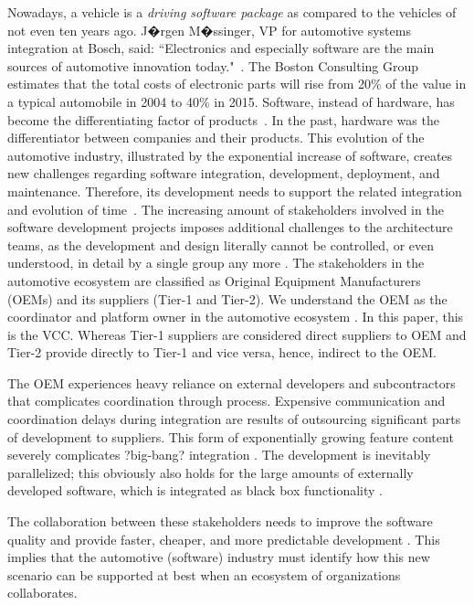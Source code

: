 Nowadays, a vehicle is a {\em driving software package} as compared to the vehicles of not even ten years ago. J�rgen M�ssinger, VP for automotive systems integration at Bosch, said: ``Electronics and especially software are the main sources of automotive innovation today."~\cite{Mossinger2010SoftwareAutomotive}. The Boston Consulting Group estimates that the total costs of electronic parts will rise from 20\% of the value in a typical automobile in 2004 to 40\% in 2015. Software, instead of hardware, has become the differentiating factor of products~\cite{ConnectedVehicle2012,hbr2015hardwaresoftware,Mossinger2010SoftwareAutomotive,Broy:2006:CAS:1134285.1134292}. In the past, hardware was the differentiator between companies and their products. This evolution of the automotive industry, illustrated by the exponential increase of software, creates new challenges regarding software integration, development, deployment, and maintenance. Therefore, its development needs to support the related integration and evolution of time~\cite{Broy:2006:CAS:1134285.1134292,Patrizio2016AAF_Chalmers,qualman2009socialnomics,JansenTale2009}. The increasing amount of stakeholders involved in the software development projects imposes additional challenges to the architecture teams, as the development and design literally cannot be controlled, or even understood, in detail by a single group any more \cite{Patrizio2016AAF_Chalmers}. The stakeholders in the automotive ecosystem are classified as Original Equipment Manufacturers (OEMs) and its suppliers (Tier-1 and Tier-2). We understand the OEM as the coordinator and platform owner in the automotive ecosystem \cite{KS15,Patrizio2016AAF_Chalmers}. In this paper, this is the VCC. Whereas Tier-1 suppliers are considered direct suppliers to OEM and Tier-2 provide directly to Tier-1 and vice versa, hence, indirect to the OEM. 

The OEM experiences heavy reliance on external developers and subcontractors that complicates coordination through process. Expensive communication and coordination delays during integration are results of outsourcing significant parts of development to suppliers. This form of exponentially growing feature content severely complicates ?big-bang? integration \cite{Eklund2012}. The development is inevitably parallelized; this obviously also holds for the large amounts of externally developed software, which is integrated as black box functionality \cite{Patrizio2016AAF_Chalmers,Broy2009AAF_TUM,Broy:2006:CAS:1134285.1134292}. 

The collaboration between these stakeholders needs to improve the software quality and provide faster, cheaper, and more predictable development \cite{herbsleb2016IntelligentTransparent}. This implies that the automotive (software) industry must identify how this new scenario can be supported at best when an ecosystem of organizations collaborates.

